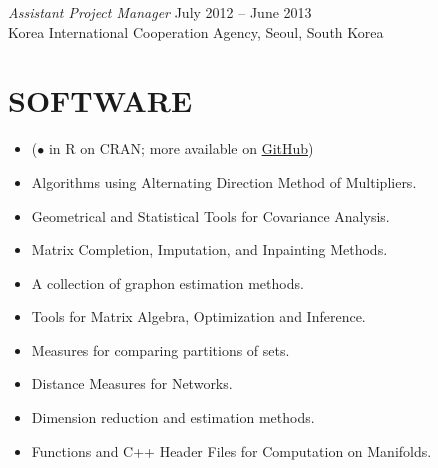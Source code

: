 \documentclass[margin, 10pt]{res} %
\begin{document}
\begin{resume}
{\sl Assistant Project Manager} \hfill July 2012 -- June 2013 \\
Korea International Cooperation Agency, Seoul, South Korea

\vspace{.2cm}



\section{\sf SOFTWARE} 

\begin{itemize} \itemsep -1pt
	\item[]($\bullet$ in R on CRAN; more available on \href{http://github.com/kyoustat}{GitHub})
    \item{ Algorithms using Alternating Direction Method of Multipliers.}
    \item{  Geometrical and Statistical Tools for Covariance Analysis.}
    \item{  Matrix Completion, Imputation, and Inpainting Methods.}
    \item{ A collection of graphon estimation methods.}
    \item{  Tools for Matrix Algebra, Optimization and Inference.}
    \item{  Measures for comparing partitions of sets.}
    \item{  Distance Measures for Networks.}
    \item{  Dimension reduction and estimation methods.}
    \item{ Functions and C++ Header Files for Computation on Manifolds.}

\end{itemize}
\end{resume}
\end{document}
